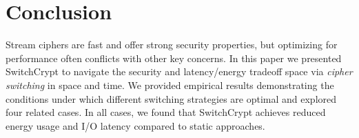 \section{Conclusion}\label{sec:conclusion}

Stream ciphers are fast and offer strong security properties, but optimizing for
performance often conflicts with other key concerns. In this paper we presented
SwitchCrypt to navigate the security and latency/energy tradeoff space via
\emph{cipher switching} in space and time. We provided empirical results
demonstrating the conditions under which different switching strategies are
optimal and explored four related cases. In all cases, we found that SwitchCrypt
achieves reduced energy usage and I/O latency compared to static approaches.

